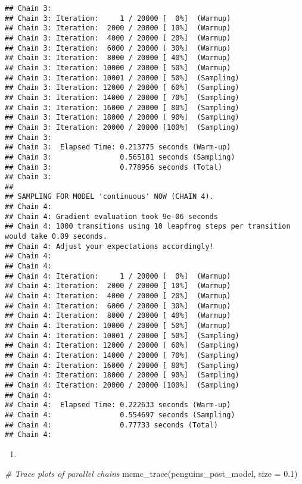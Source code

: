 \documentclass[
]{article}
\newenvironment{Shaded}{\begin{snugshade}}{\end{snugshade}}
\newcommand{\AttributeTok}[1]{\textcolor[rgb]{0.77,0.63,0.00}{#1}}
\newcommand{\CommentTok}[1]{\textcolor[rgb]{0.56,0.35,0.01}{\textit{#1}}}
\newcommand{\FloatTok}[1]{\textcolor[rgb]{0.00,0.00,0.81}{#1}}
\newcommand{\FunctionTok}[1]{\textcolor[rgb]{0.00,0.00,0.00}{#1}}
\newcommand{\NormalTok}[1]{#1}
\providecommand{\tightlist}{%
  \setlength{\itemsep}{0pt}\setlength{\parskip}{0pt}}
\begin{document}
\begin{verbatim}
## Chain 3: 
## Chain 3: Iteration:     1 / 20000 [  0%]  (Warmup)
## Chain 3: Iteration:  2000 / 20000 [ 10%]  (Warmup)
## Chain 3: Iteration:  4000 / 20000 [ 20%]  (Warmup)
## Chain 3: Iteration:  6000 / 20000 [ 30%]  (Warmup)
## Chain 3: Iteration:  8000 / 20000 [ 40%]  (Warmup)
## Chain 3: Iteration: 10000 / 20000 [ 50%]  (Warmup)
## Chain 3: Iteration: 10001 / 20000 [ 50%]  (Sampling)
## Chain 3: Iteration: 12000 / 20000 [ 60%]  (Sampling)
## Chain 3: Iteration: 14000 / 20000 [ 70%]  (Sampling)
## Chain 3: Iteration: 16000 / 20000 [ 80%]  (Sampling)
## Chain 3: Iteration: 18000 / 20000 [ 90%]  (Sampling)
## Chain 3: Iteration: 20000 / 20000 [100%]  (Sampling)
## Chain 3: 
## Chain 3:  Elapsed Time: 0.213775 seconds (Warm-up)
## Chain 3:                0.565181 seconds (Sampling)
## Chain 3:                0.778956 seconds (Total)
## Chain 3: 
## 
## SAMPLING FOR MODEL 'continuous' NOW (CHAIN 4).
## Chain 4: 
## Chain 4: Gradient evaluation took 9e-06 seconds
## Chain 4: 1000 transitions using 10 leapfrog steps per transition would take 0.09 seconds.
## Chain 4: Adjust your expectations accordingly!
## Chain 4: 
## Chain 4: 
## Chain 4: Iteration:     1 / 20000 [  0%]  (Warmup)
## Chain 4: Iteration:  2000 / 20000 [ 10%]  (Warmup)
## Chain 4: Iteration:  4000 / 20000 [ 20%]  (Warmup)
## Chain 4: Iteration:  6000 / 20000 [ 30%]  (Warmup)
## Chain 4: Iteration:  8000 / 20000 [ 40%]  (Warmup)
## Chain 4: Iteration: 10000 / 20000 [ 50%]  (Warmup)
## Chain 4: Iteration: 10001 / 20000 [ 50%]  (Sampling)
## Chain 4: Iteration: 12000 / 20000 [ 60%]  (Sampling)
## Chain 4: Iteration: 14000 / 20000 [ 70%]  (Sampling)
## Chain 4: Iteration: 16000 / 20000 [ 80%]  (Sampling)
## Chain 4: Iteration: 18000 / 20000 [ 90%]  (Sampling)
## Chain 4: Iteration: 20000 / 20000 [100%]  (Sampling)
## Chain 4: 
## Chain 4:  Elapsed Time: 0.222633 seconds (Warm-up)
## Chain 4:                0.554697 seconds (Sampling)
## Chain 4:                0.77733 seconds (Total)
## Chain 4:
\end{verbatim}

\begin{enumerate}
\def\labelenumi{\alph{enumi}.}
\setcounter{enumi}{1}
\tightlist
\item
\end{enumerate}

\begin{Shaded}
\begin{Highlighting}[]
\CommentTok{\# Trace plots of parallel chains}
\FunctionTok{mcmc\_trace}\NormalTok{(penguins\_post\_model, }\AttributeTok{size =} \FloatTok{0.1}\NormalTok{)}
\end{Highlighting}
\end{Shaded}
\end{document}
